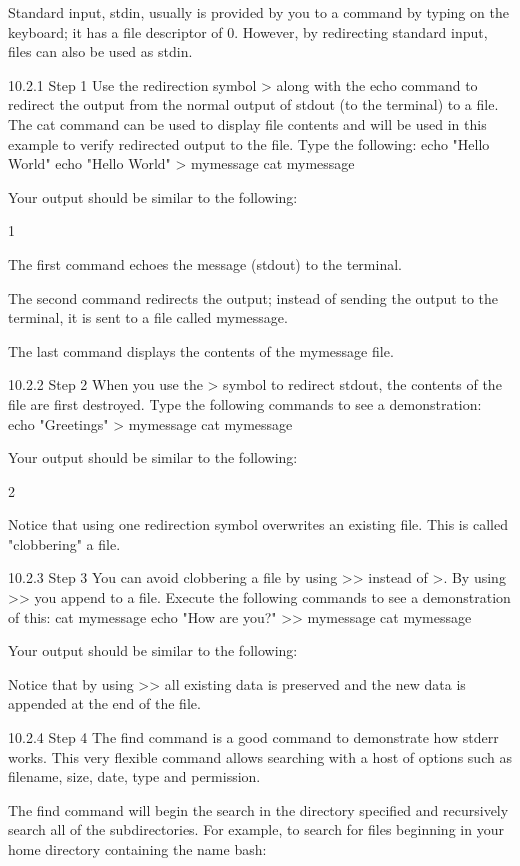 Standard input, stdin, usually is provided by you to a command by typing on the keyboard; it
has a file descriptor of 0. However, by redirecting standard input, files can also be used as
stdin.

10.2.1 Step 1
Use the redirection symbol > along with the echo command to redirect the output from the
normal output of stdout (to the terminal) to a file. The cat command can be used to display file
contents and will be used in this example to verify redirected output to the file. Type the following:
echo "Hello World"
echo "Hello World" > mymessage
cat mymessage

Your output should be similar to the following:

1



The first command echoes the message (stdout) to the terminal.

The second command redirects the output; instead of sending the output to the terminal,
it is sent to a file called mymessage.

The last command displays the contents of the mymessage file.

10.2.2 Step 2
When you use the > symbol to redirect stdout, the contents of the file are first destroyed. Type
the following commands to see a demonstration:
echo "Greetings" > mymessage
cat mymessage

Your output should be similar to the following:

2



Notice that using one redirection symbol overwrites an existing file. This is called "clobbering"
a file.

10.2.3 Step 3
You can avoid clobbering a file by using >> instead of >. By using >> you append to a file.
Execute the following commands to see a demonstration of this:
cat mymessage
echo "How are you?" >> mymessage
cat mymessage

Your output should be similar to the following:

Notice that by using >> all existing data is preserved and the new data is appended at the end of the
file.

10.2.4 Step 4
The find command is a good command to demonstrate how stderr works. This very flexible
command allows searching with a host of options such as filename, size, date, type and
permission.

The find command will begin the search in the directory specified and recursively search all of
the subdirectories. For example, to search for files beginning in your home directory containing
the name bash:

